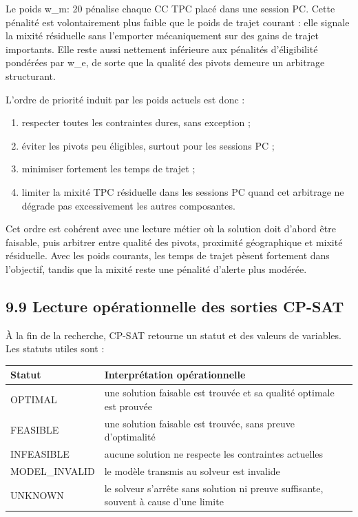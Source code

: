 \documentclass[11pt,a4paper]{article}
\begin{document}
Le poids w\_m: 20 pénalise chaque CC TPC placé dans une session PC. Cette pénalité est volontairement plus faible que le poids de trajet courant : elle signale la mixité résiduelle sans l'emporter mécaniquement sur des gains de trajet importants. Elle reste aussi nettement inférieure aux pénalités d'éligibilité pondérées par w\_e, de sorte que la qualité des pivots demeure un arbitrage structurant.

L'ordre de priorité induit par les poids actuels est donc :

\begin{enumerate}
\item respecter toutes les contraintes dures, sans exception ;
\item éviter les pivots peu éligibles, surtout pour les sessions PC ;
\item minimiser fortement les temps de trajet ;
\item limiter la mixité TPC résiduelle dans les sessions PC quand cet arbitrage ne dégrade pas excessivement les autres composantes.

\end{enumerate}

Cet ordre est cohérent avec une lecture métier où la solution doit d'abord être faisable, puis arbitrer entre qualité des pivots, proximité géographique et mixité résiduelle. Avec les poids courants, les temps de trajet pèsent fortement dans l'objectif, tandis que la mixité reste une pénalité d'alerte plus modérée.

\subsection{9.9 Lecture opérationnelle des sorties CP-SAT}

À la fin de la recherche, CP-SAT retourne un statut et des valeurs de variables. Les statuts utiles sont :

\begin{longtable}{|L{0.28\textwidth}|L{0.62\textwidth}|}
\hline
Statut & Interprétation opérationnelle \\
\hline
\endhead
OPTIMAL & une solution faisable est trouvée et sa qualité optimale est prouvée \\
\hline
FEASIBLE & une solution faisable est trouvée, sans preuve d'optimalité \\
\hline
INFEASIBLE & aucune solution ne respecte les contraintes actuelles \\
\hline
MODEL\_INVALID & le modèle transmis au solveur est invalide \\
\hline
UNKNOWN & le solveur s'arrête sans solution ni preuve suffisante, souvent à cause d'une limite \\
\hline
\end{longtable}
\end{document}
